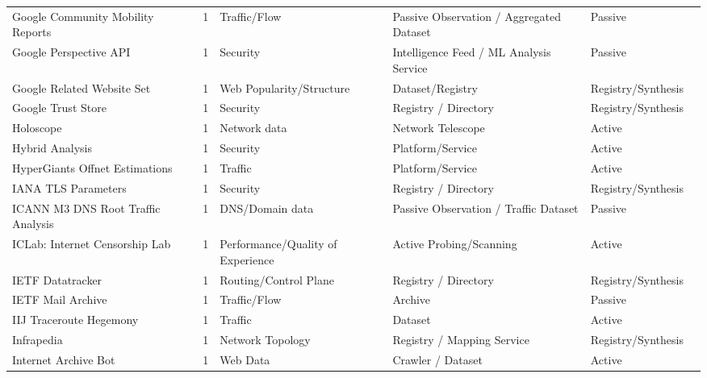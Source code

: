 \documentclass[11pt,a4paper]{article}
\begin{document}
\begin{longtable}{@{}p{}p{}p{}p{}p{}p{}p{}@{}}
Google Community Mobility Reports & \cite{google_mobility} & 1 & Traffic/Flow & Passive Observation / Aggregated Dataset & Passive & \cite{10.1145/3487552.3487831} \\
Google Perspective API & \cite{perspective_api} & 1 & Security & Intelligence Feed / ML Analysis Service & Passive & \cite{10.1145/3618257.3624820} \\
Google Related Website Set & \cite{related} & 1 & Web Popularity/Structure & Dataset/Registry & Registry/Synthesis & \cite{10.1145/3646547.3689026} \\
Google Trust Store & \cite{google_trust_store} & 1 & Security & Registry / Directory & Registry/Synthesis & \cite{10.1007/978-3-031-28486-1_4} \\
Holoscope & \cite{holoscope} & 1 & Network data & Network Telescope & Active & \cite{10.1145/3777912.3839810} \\
Hybrid Analysis & \cite{hybrid} & 1 & Security & Platform/Service & Active & \cite{10.1145/3777912.3809151} \\
HyperGiants Offnet Estimations & \cite{10.1145/3452296.3472928} & 1 & Traffic & Platform/Service & Active & \cite{10.1145/3777912.3839831} \\
IANA TLS Parameters & \cite{iana_tls_parameters} & 1 & Security & Registry / Directory & Registry/Synthesis & \cite{10.1007/978-3-031-28486-1_6} \\
ICANN M3 DNS Root Traffic Analysis & \cite{icann_m3_dns} & 1 & DNS/Domain data & Passive Observation / Traffic Dataset & Passive & \cite{10.1007/978-3-031-28486-1_21} \\
ICLab: Internet Censorship Lab & \cite{iclab} & 1 & Performance/Quality of Experience & Active Probing/Scanning & Active & \cite{10.1007/978-3-030-98785-5_23} \\
IETF Datatracker & \cite{ietf_datatracker} & 1 & Routing/Control Plane & Registry / Directory & Registry/Synthesis & \cite{10.1145/3487552.3487821} \\
IETF Mail Archive & \cite{ietf_mail_archive} & 1 & Traffic/Flow & Archive & Passive & \cite{10.1145/3487552.3487821} \\
IIJ Traceroute Hegemony & \cite{10.1007/978-3-031-56252-5_10} & 1 & Traffic & Dataset & Active & \cite{10.1145/3777912.3839831} \\
Infrapedia & \cite{infrapedia} & 1 & Network Topology & Registry / Mapping Service & Registry/Synthesis & \cite{10.1007/978-3-030-98785-5_29} \\
Internet Archive Bot & \cite{internet_archive_bot} & 1 & Web Data & Crawler / Dataset & Active & \cite{10.1145/3517745.3561451} \\

\end{longtable}
\end{document}
